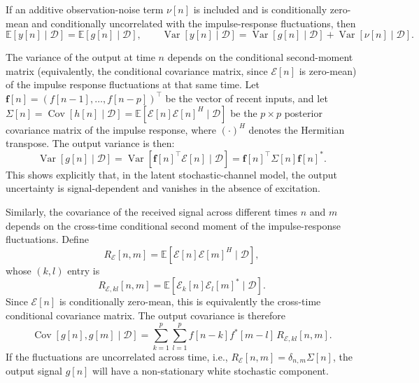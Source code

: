 \documentclass[preprint,1p,times,authoryear]{elsarticle}
\begin{document}
If an additive observation-noise term $\nu[n]$ is included and is conditionally zero-mean and conditionally uncorrelated with the impulse-response fluctuations, then
\[
\mathbb{E}[y[n]\mid\mathcal{D}] = \mathbb{E}[g[n]\mid\mathcal{D}],
\qquad
\operatorname{Var}[y[n]\mid\mathcal{D}] = \operatorname{Var}[g[n]\mid\mathcal{D}] + \operatorname{Var}[\nu[n]\mid\mathcal{D}].
\]

The variance of the output at time $n$ depends on the conditional second-moment matrix (equivalently, the conditional covariance matrix, since $\mathcal{E}[n]$ is zero-mean) of the impulse response fluctuations at that same time. Let $\mathbf{f}[n]=(f[n-1], \ldots, f[n-p])^\top$ be the vector of recent inputs, and let $\Sigma[n]=\operatorname{Cov}[h[n]\mid\mathcal{D}] = \mathbb{E}[\mathcal{E}[n]\mathcal{E}[n]^{H} \mid \mathcal{D}]$ be the $p \times p$ posterior covariance matrix of the impulse response, where $(\cdot)^H$ denotes the Hermitian transpose. The output variance is then:
\begin{equation}
\operatorname{Var}[ g[n] \mid \mathcal{D} ] = \operatorname{Var}[ \mathbf{f}[n]^\top \mathcal{E}[n] \mid \mathcal{D} ] = \mathbf{f}[n]^\top \Sigma[n] \mathbf{f}[n]^*.
\end{equation}
This shows explicitly that, in the latent stochastic-channel model, the output uncertainty is signal-dependent and vanishes in the absence of excitation.

Similarly, the covariance of the received signal across different times $n$ and $m$ depends on the cross-time conditional second moment of the impulse-response fluctuations. Define
\[
R_{\mathcal{E}}[n,m] = \mathbb{E}\!\left[\mathcal{E}[n]\mathcal{E}[m]^H \mid \mathcal{D}\right],
\]
whose $(k,l)$ entry is
\[
R_{\mathcal{E},kl}[n,m] = \mathbb{E}\!\left[\mathcal{E}_k[n]\mathcal{E}_l[m]^* \mid \mathcal{D}\right].
\]
Since $\mathcal{E}[n]$ is conditionally zero-mean, this is equivalently the cross-time conditional covariance matrix. The output covariance is therefore
\begin{equation}
\operatorname{Cov}[ g[n], g[m] \mid \mathcal{D} ] = \sum_{k=1}^{p} \sum_{l=1}^{p} f[n - k] f^*[m - l] \, R_{\mathcal{E},kl}[n,m].
\end{equation}
If the fluctuations are uncorrelated across time, i.e., $R_{\mathcal{E}}[n,m] = \delta_{n,m} \Sigma[n]$, the output signal $g[n]$ will have a non-stationary white stochastic component.
\end{document}
